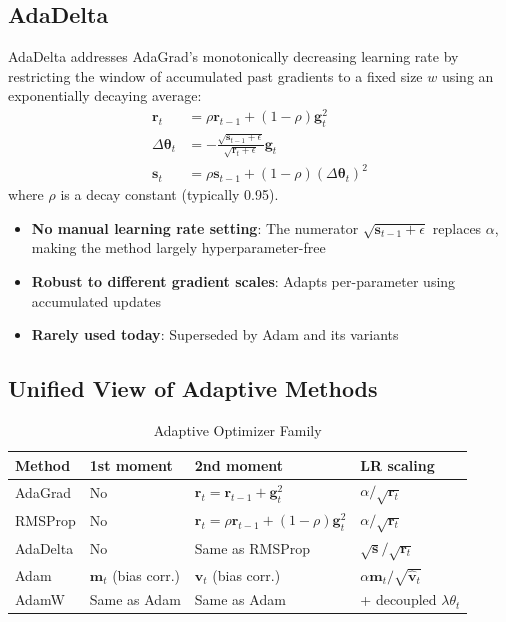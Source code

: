 \subsection{AdaDelta}

AdaDelta \cite{zeiler2012adadelta} addresses AdaGrad's monotonically decreasing learning rate by restricting the window of accumulated past gradients to a fixed size $w$ using an exponentially decaying average:
\begin{align}
\mathbf{r}_t &= \rho \mathbf{r}_{t-1} + (1 - \rho)\mathbf{g}_t^2 \\
\Delta\boldsymbol{\theta}_t &= -\frac{\sqrt{\mathbf{s}_{t-1} + \epsilon}}{\sqrt{\mathbf{r}_t + \epsilon}}\mathbf{g}_t \\
\mathbf{s}_t &= \rho \mathbf{s}_{t-1} + (1 - \rho)(\Delta\boldsymbol{\theta}_t)^2
\end{align}
where $\rho$ is a decay constant (typically 0.95).

\begin{properties}
\begin{itemize}
    \item \textbf{No manual learning rate setting}: The numerator $\sqrt{\mathbf{s}_{t-1} + \epsilon}$ replaces $\alpha$, making the method largely hyperparameter-free
    \item \textbf{Robust to different gradient scales}: Adapts per-parameter using accumulated updates
    \item \textbf{Rarely used today}: Superseded by Adam and its variants
\end{itemize}
\end{properties}

\subsection{Unified View of Adaptive Methods}

\begin{table}[ht]
    \centering
    \caption{Adaptive Optimizer Family}
    \begin{tabular}{L{2cm} L{3cm} L{3cm} L{3.5cm}}
        \toprule
        \textbf{Method} & \textbf{1st moment} & \textbf{2nd moment} & \textbf{LR scaling} \\
        \midrule
        AdaGrad & No & $\mathbf{r}_t = \mathbf{r}_{t-1} + \mathbf{g}_t^2$ & $\alpha / \sqrt{\mathbf{r}_t}$ \\
        RMSProp & No & $\mathbf{r}_t = \rho\mathbf{r}_{t-1} + (1-\rho)\mathbf{g}_t^2$ & $\alpha / \sqrt{\mathbf{r}_t}$ \\
        AdaDelta & No & Same as RMSProp & $\sqrt{\mathbf{s}} / \sqrt{\mathbf{r}_t}$ \\
        Adam & $\mathbf{m}_t$ (bias corr.) & $\mathbf{v}_t$ (bias corr.) & $\alpha \hat{\mathbf{m}}_t / \sqrt{\hat{\mathbf{v}}_t}$ \\
        AdamW & Same as Adam & Same as Adam & + decoupled $\lambda\theta_t$ \\
        \bottomrule
    \end{tabular}
\end{table}

